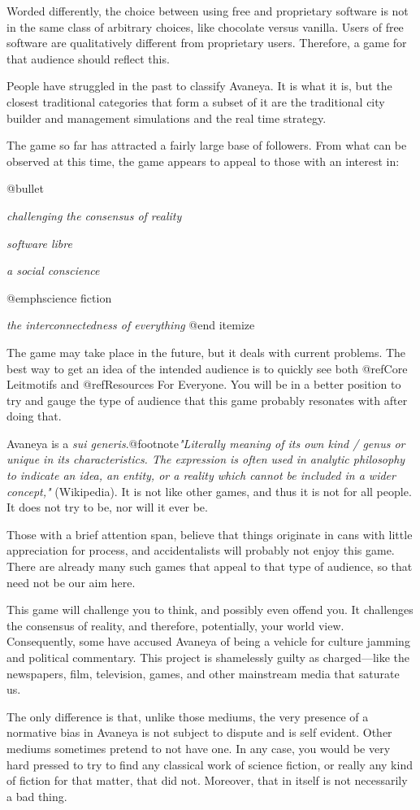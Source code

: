Worded differently, the choice between using free and proprietary software is not in the same class of arbitrary choices, like chocolate versus vanilla. Users of free software are qualitatively different from proprietary users. Therefore, a game for that audience should reflect this.

People have struggled in the past to classify Avaneya. It is what it is, but the closest traditional categories that form a subset of it are the traditional city builder and management simulations and the real time strategy.

The game so far has attracted a fairly large base of followers. From what can be observed at this time, the game appears to appeal to those with an interest in:

\itemize @bullet
\item
{\sl challenging the consensus of reality}
\item
{\sl software libre}
\item
{\sl a social conscience}
\item
@emph{science fiction}
\item
{\sl the interconnectedness of everything}
@end itemize

The game may take place in the future, but it deals with current problems. The best way to get an idea of the intended audience is to quickly see both @ref{Core Leitmotifs} and @ref{Resources For Everyone}. You will be in a better position to try and gauge the type of audience that this game probably resonates with after doing that. 

Avaneya is a {\sl sui generis}.@footnote{{\sl "Literally meaning of its own kind / genus or unique in its characteristics. The expression is often used in analytic philosophy to indicate an idea, an entity, or a reality which cannot be included in a wider concept,"} (Wikipedia).} It is not like other games, and thus it is not for all people. It does not try to be, nor will it ever be.

Those with a brief attention span, believe that things originate in cans with little appreciation for process, and accidentalists will probably not enjoy this game. There are already many such games that appeal to that type of audience, so that need not be our aim here.

This game will challenge you to think, and possibly even offend you. It challenges the consensus of reality, and therefore, potentially, your world view. Consequently, some have accused Avaneya of being a vehicle for culture jamming and political commentary. This project is shamelessly guilty as charged---like the newspapers, film, television, games, and other mainstream media that saturate us. 

The only difference is that, unlike those mediums, the very presence of a normative bias in Avaneya is not subject to dispute and is self evident. Other mediums sometimes pretend to not have one. In any case, you would be very hard pressed to try to find any classical work of science fiction, or really any kind of fiction for that matter, that did not. Moreover, that in itself is not necessarily a bad thing.


